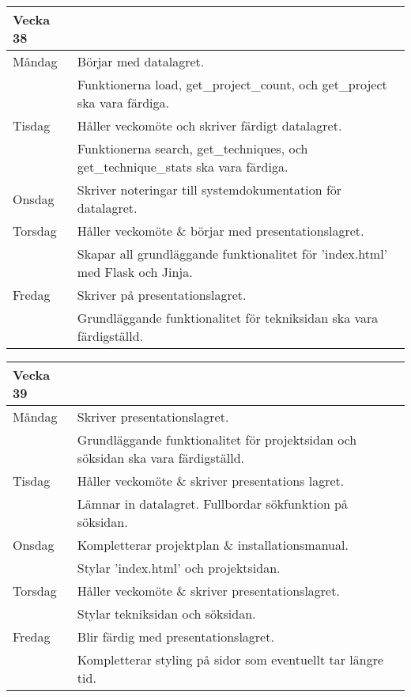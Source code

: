 \documentclass{liu_mall}
\begin{document}
        \begin{table}[!h]
            \begin{tabularx}{\textwidth}{l|l}
                Vecka 38\\\hline
                Måndag  & Börjar med datalagret.\\
                        & Funktionerna load, get\_project\_count, och get\_project ska vara färdiga.\\
                Tisdag  & Håller veckomöte och skriver färdigt datalagret.\\
                        & Funktionerna search, get\_techniques, och get\_technique\_stats ska vara färdiga.\\
                Onsdag  & Skriver noteringar till systemdokumentation för datalagret.\\
                Torsdag & Håller veckomöte \& börjar med presentationslagret.\\
                        & Skapar all grundläggande funktionalitet för 'index.html' med Flask och Jinja.\\
                Fredag  & Skriver på presentationslagret.\\
                        & Grundläggande funktionalitet för tekniksidan ska vara färdigställd.\\
            \end{tabularx}
        \end{table}
        
        \begin{table}[!h]
            \begin{tabularx}{\textwidth}{l|l}
                Vecka 39\\\hline
                Måndag  & Skriver presentationslagret.\\
                        & Grundläggande funktionalitet för projektsidan och söksidan ska vara färdigställd.\\
                Tisdag  & Håller veckomöte \& skriver presentations lagret.\\
                        & Lämnar in datalagret. Fullbordar sökfunktion på söksidan.\\
                Onsdag  & Kompletterar projektplan \& installationsmanual.\\
                        & Stylar 'index.html' och projektsidan.\\
                Torsdag & Håller veckomöte \& skriver presentationslagret.\\
                        & Stylar tekniksidan och söksidan.\\
                Fredag  & Blir färdig med presentationslagret.\\
                        & Kompletterar styling på sidor som eventuellt tar längre tid.\\
            \end{tabularx}
        \end{table}
        
\end{document}
